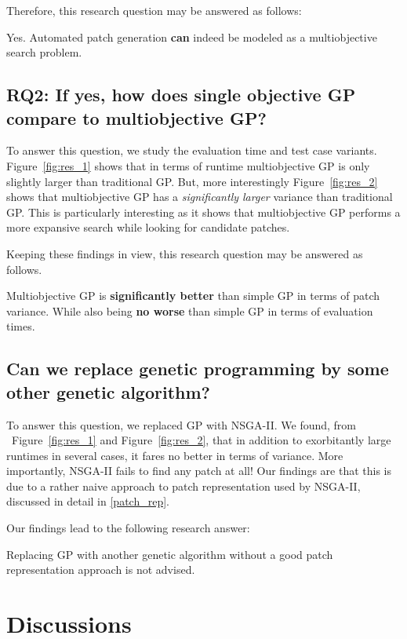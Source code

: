 \documentclass{sig-alternate}
\theoremstyle{break}
\newcommand{\fig}[1]{Figure~\ref{fig:#1}}
\begin{document}
Therefore, this research question may be answered as follows:
\begin{lesson}
Yes. Automated patch generation \textbf{can} indeed be modeled as a multiobjective search problem.
\end{lesson}
 
\subsection*{RQ2: If yes, how does single objective GP compare to multiobjective GP?}
To answer this question, we study the evaluation time and test case variants. \fig{res_1} shows that in terms of runtime multiobjective GP is only slightly larger than traditional GP. But, more interestingly \fig{res_2} shows that multiobjective GP has a \textit{significantly  larger} variance than traditional GP. This is particularly interesting as it shows that multiobjective GP performs a more expansive search while looking for candidate patches.
  
Keeping these findings in view, this research question may be answered as follows.
\begin{lesson}
   Multiobjective GP is \textbf{significantly better} than simple GP in terms of patch variance. While also being \textbf{no worse} than simple GP in terms of evaluation times.
\end{lesson}

\subsection*{Can we replace genetic programming by some other genetic algorithm?}
To answer this question, we replaced GP with NSGA-II. We found, from ~\fig{res_1} and \fig{res_2}, that in addition to exorbitantly large runtimes in several cases, it fares no better in terms of variance. More importantly, NSGA-II fails to find any patch at all! Our findings are that this is due to a rather naive approach to patch representation used by NSGA-II, discussed in detail in \ref{patch_rep}.

Our findings lead to the following research answer:
\begin{lesson}
  Replacing GP with another genetic algorithm without a good patch representation approach is not advised.
\end{lesson}

\section{Discussions}
\label{discuss}
\end{document}
